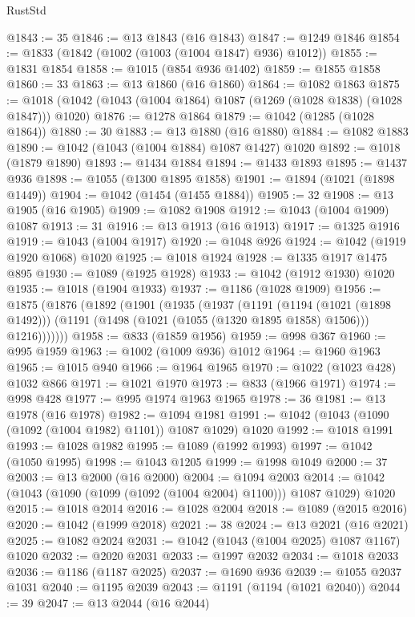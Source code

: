 \begin{lexlean}{RustStd}
\begin{coremodule}
@1843 := 35
@1846 := @13 @1843 (@16 @1843)
@1847 := @1249 @1846
@1854 := @1833 (@1842 (@1002 (@1003 (@1004 @1847) @936) @1012))
@1855 := @1831 @1854
@1858 := @1015 (@854 @936 @1402)
@1859 := @1855 @1858
@1860 := 33
@1863 := @13 @1860 (@16 @1860)
@1864 := @1082 @1863
@1875 := @1018 (@1042 (@1043 (@1004 @1864) @1087 (@1269 (@1028 @1838) (@1028 @1847))) @1020)
@1876 := @1278 @1864
@1879 := @1042 (@1285 (@1028 @1864))
@1880 := 30
@1883 := @13 @1880 (@16 @1880)
@1884 := @1082 @1883
@1890 := @1042 (@1043 (@1004 @1884) @1087 @1427) @1020
@1892 := @1018 (@1879 @1890)
@1893 := @1434 @1884
@1894 := @1433 @1893
@1895 := @1437 @936
@1898 := @1055 (@1300 @1895 @1858)
@1901 := @1894 (@1021 (@1898 @1449))
@1904 := @1042 (@1454 (@1455 @1884))
@1905 := 32
@1908 := @13 @1905 (@16 @1905)
@1909 := @1082 @1908
@1912 := @1043 (@1004 @1909) @1087
@1913 := 31
@1916 := @13 @1913 (@16 @1913)
@1917 := @1325 @1916
@1919 := @1043 (@1004 @1917)
@1920 := @1048 @926
@1924 := @1042 (@1919 @1920 @1068) @1020
@1925 := @1018 @1924
@1928 := @1335 @1917 @1475 @895
@1930 := @1089 (@1925 @1928)
@1933 := @1042 (@1912 @1930) @1020
@1935 := @1018 (@1904 @1933)
@1937 := @1186 (@1028 @1909)
@1956 := @1875
    (@1876
      (@1892
        (@1901
          (@1935
            (@1937
              (@1191
                (@1194 (@1021 (@1898 @1492)))
                (@1191 (@1498 (@1021 (@1055 (@1320 @1895 @1858) @1506))) @1216)))))))
@1958 := @833 (@1859 @1956)
@1959 := @998 @367
@1960 := @995 @1959
@1963 := @1002 (@1009 @936) @1012
@1964 := @1960 @1963
@1965 := @1015 @940
@1966 := @1964 @1965
@1970 := @1022 (@1023 @428) @1032 @866
@1971 := @1021 @1970
@1973 := @833 (@1966 @1971)
@1974 := @998 @428
@1977 := @995 @1974 @1963 @1965
@1978 := 36
@1981 := @13 @1978 (@16 @1978)
@1982 := @1094 @1981
@1991 := @1042 (@1043 (@1090 (@1092 (@1004 @1982) @1101)) @1087 @1029) @1020
@1992 := @1018 @1991
@1993 := @1028 @1982
@1995 := @1089 (@1992 @1993)
@1997 := @1042 (@1050 @1995)
@1998 := @1043 @1205
@1999 := @1998 @1049
@2000 := 37
@2003 := @13 @2000 (@16 @2000)
@2004 := @1094 @2003
@2014 := @1042 (@1043 (@1090 (@1099 (@1092 (@1004 @2004) @1100))) @1087 @1029) @1020
@2015 := @1018 @2014
@2016 := @1028 @2004
@2018 := @1089 (@2015 @2016)
@2020 := @1042 (@1999 @2018)
@2021 := 38
@2024 := @13 @2021 (@16 @2021)
@2025 := @1082 @2024
@2031 := @1042 (@1043 (@1004 @2025) @1087 @1167) @1020
@2032 := @2020 @2031
@2033 := @1997 @2032
@2034 := @1018 @2033
@2036 := @1186 (@1187 @2025)
@2037 := @1690 @936
@2039 := @1055 @2037 @1031
@2040 := @1195 @2039
@2043 := @1191 (@1194 (@1021 @2040))
@2044 := 39
@2047 := @13 @2044 (@16 @2044)

\end{coremodule}
\end{lexlean}
